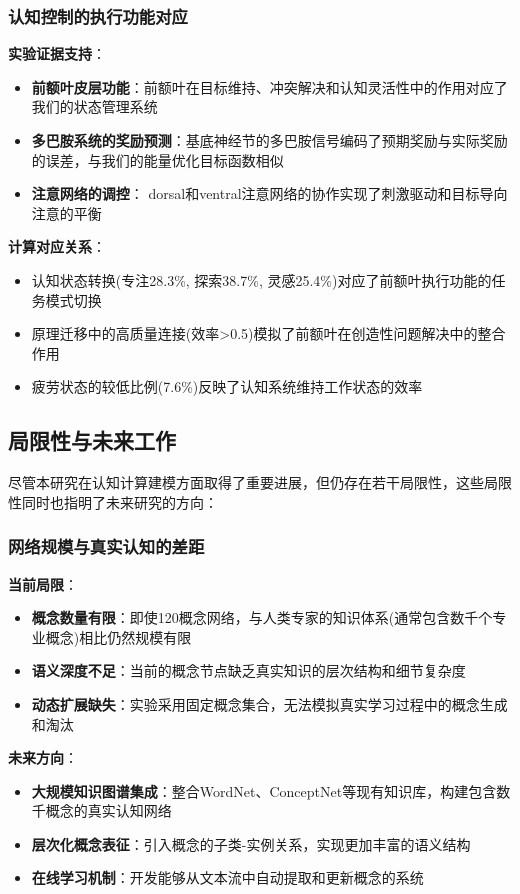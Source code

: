 \documentclass[12pt,a4paper]{article}
\begin{document}
\subsubsection{认知控制的执行功能对应}

\textbf{实验证据支持}：
\begin{itemize}
\item \textbf{前额叶皮层功能}：前额叶在目标维持、冲突解决和认知灵活性中的作用对应了我们的状态管理系统
\item \textbf{多巴胺系统的奖励预测}：基底神经节的多巴胺信号编码了预期奖励与实际奖励的误差，与我们的能量优化目标函数相似
\item \textbf{注意网络的调控}： dorsal和ventral注意网络的协作实现了刺激驱动和目标导向注意的平衡
\end{itemize}

\textbf{计算对应关系}：
\begin{itemize}
\item 认知状态转换(专注28.3\%, 探索38.7\%, 灵感25.4\%)对应了前额叶执行功能的任务模式切换
\item 原理迁移中的高质量连接(效率>0.5)模拟了前额叶在创造性问题解决中的整合作用
\item 疲劳状态的较低比例(7.6\%)反映了认知系统维持工作状态的效率
\end{itemize}

\subsection{局限性与未来工作}

尽管本研究在认知计算建模方面取得了重要进展，但仍存在若干局限性，这些局限性同时也指明了未来研究的方向：

\subsubsection{网络规模与真实认知的差距}

\textbf{当前局限}：
\begin{itemize}
\item \textbf{概念数量有限}：即使120概念网络，与人类专家的知识体系(通常包含数千个专业概念)相比仍然规模有限
\item \textbf{语义深度不足}：当前的概念节点缺乏真实知识的层次结构和细节复杂度
\item \textbf{动态扩展缺失}：实验采用固定概念集合，无法模拟真实学习过程中的概念生成和淘汰
\end{itemize}

\textbf{未来方向}：
\begin{itemize}
\item \textbf{大规模知识图谱集成}：整合WordNet、ConceptNet等现有知识库，构建包含数千概念的真实认知网络
\item \textbf{层次化概念表征}：引入概念的子类-实例关系，实现更加丰富的语义结构
\item \textbf{在线学习机制}：开发能够从文本流中自动提取和更新概念的系统
\end{itemize}
\end{document}
